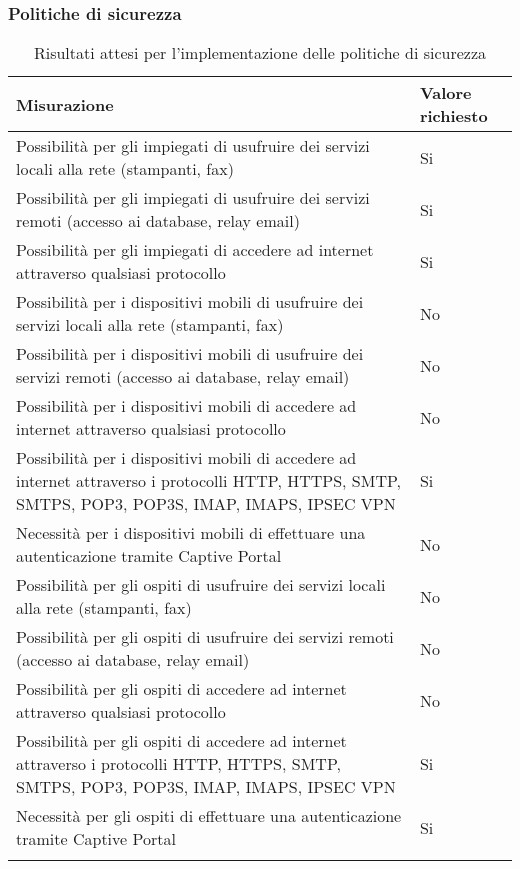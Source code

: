 \documentclass[Tesi.tex]{subfiles}
\begin{document}
\subsubsection{Politiche di sicurezza}
\label{table:Risultati attesi per l'implementazione delle politiche di sicurezza}
\renewcommand*{\arraystretch}{1.2}
\begin{longtable}[H]{p{9.5cm}p{3.4cm}}
	\rowcolor{CHeader}
	\color{CHeaderText} \textbf{Misurazione} & \color{CHeaderText} \textbf{Valore richiesto} \\
	\endhead
	Possibilità per gli impiegati di usufruire dei servizi locali alla rete (stampanti, fax) &
	Si \\
	Possibilità per gli impiegati di usufruire dei servizi remoti (accesso ai database, relay email) &
	Si \\
	Possibilità per gli impiegati di accedere ad internet attraverso qualsiasi protocollo &
	Si \\
	Possibilità per i dispositivi mobili di usufruire dei servizi locali alla rete (stampanti, fax) &
	No \\
	Possibilità per i dispositivi mobili di usufruire dei servizi remoti (accesso ai database, relay email) &
	No \\
	Possibilità per i dispositivi mobili di accedere ad internet attraverso qualsiasi protocollo &
	No \\
	Possibilità per i dispositivi mobili di accedere ad internet attraverso i protocolli HTTP, HTTPS, SMTP, SMTPS, POP3, POP3S, IMAP, IMAPS, IPSEC VPN &
	Si \\
	Necessità per i dispositivi mobili di effettuare una autenticazione tramite Captive Portal &
	No \\
	Possibilità per gli ospiti di usufruire dei servizi locali alla rete (stampanti, fax) &
	No \\
	Possibilità per gli ospiti di usufruire dei servizi remoti (accesso ai database, relay email) &
	No \\
	Possibilità per gli ospiti di accedere ad internet attraverso qualsiasi protocollo &
	No \\
	Possibilità per gli ospiti di accedere ad internet attraverso i protocolli HTTP, HTTPS, SMTP, SMTPS, POP3, POP3S, IMAP, IMAPS, IPSEC VPN &
	Si \\
	Necessità per gli ospiti di effettuare una autenticazione tramite Captive Portal &
	Si \\
	\hiderowcolors
	\caption{Risultati attesi per l'implementazione delle politiche di sicurezza}
\end{longtable}
\end{document}
